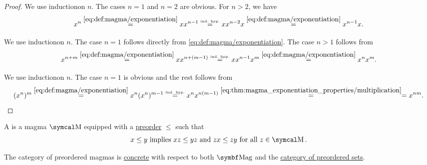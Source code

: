 \begin{proof}
   We use induction\IND on \( n \). The cases \( n = 1 \) and \( n = 2 \) are obvious. For \( n > 2 \), we have
  \begin{equation*}
    x^n
    \overset {\eqref{eq:def:magma/exponentiation}} =
    x x^{n-1}
    \overset {\scriptscriptstyle{\text{ind. hyp.}}} =
    x x^{n-2} x
    \overset {\eqref{eq:def:magma/exponentiation}} =
    x^{n-1} x.
  \end{equation*}

   We use induction\LEM on \( n \). The case \( n = 1 \) follows directly from \eqref{eq:def:magma/exponentiation}. The case \( n > 1 \) follows from
  \begin{equation*}
    x^{n + m}
    \overset {\eqref{eq:def:magma/exponentiation}} =
    x x^{n + (m - 1)}
    \overset {\scriptscriptstyle{\text{ind. hyp.}}} =
    x x^{n-1} x^m
    \overset {\eqref{eq:def:magma/exponentiation}} =
    x^n x^m.
  \end{equation*}

   We use induction\LEM on \( n \). The case \( n = 1 \) is obvious and the rest follows from
  \begin{equation*}
    (x^n)^m
    \overset {\eqref{eq:def:magma/exponentiation}} =
    x^n (x^n)^{m-1}
    \overset {\scriptscriptstyle{\text{ind. hyp.}}} =
    x^n x^{n (m - 1)}
    \overset {\eqref{eq:thm:magma_exponentiation_properties/multiplication}} =
    =
    x^{nm}.
  \end{equation*}
\end{proof}

\begin{definition}\label{def:preordered_magma}
  A  is a magma \( \CM \) equipped with a \hyperref[def:preordered_set]{preorder} \( \leq \) such that
  \begin{equation}\label{eq:def:preordered_magma/compatibility}
    x \leq y \T{implies} xz \leq yz \T{and} zx \leq zy \T{for all} z \in \CM.
  \end{equation}

  The category of preordered magmas is \hyperref[def:concrete_category]{concrete} with respect to both \( \Cat{Mag} \) and the \hyperref[def:magma/preordered]{category of preordered sets}.
\end{definition}

